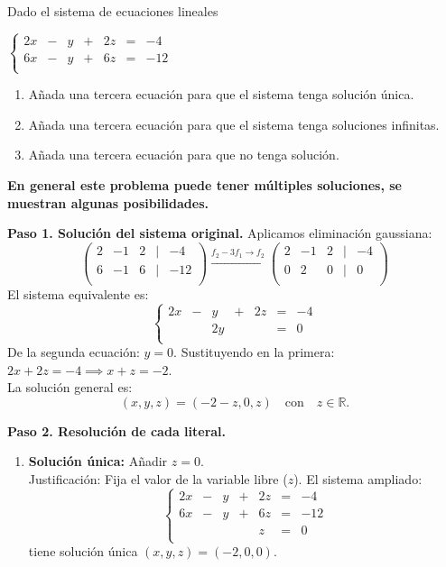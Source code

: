 \begin{prob} 
Dado el sistema de ecuaciones lineales

$\left\lbrace \begin{array}{ccccccc}
2x&-&y&+&2z&=&-4\\
6x&-&y&+&6z&=&-12\\
\end{array} \right. $

\begin{enumerate}[$a)$]
\item Añada una tercera ecuación para que el sistema tenga solución única.
\item Añada una tercera ecuación para que el sistema tenga soluciones infinitas.
\item Añada una tercera ecuación para que no tenga solución.
\end{enumerate}

\begin{myproof} \textbf{En general este problema puede tener múltiples soluciones, se muestran algunas posibilidades.}

\textbf{Paso 1. Solución del sistema original.} Aplicamos eliminación gaussiana:
\[
\begin{pmatrix}
2 & -1 & 2 & | & -4 \\
6 & -1 & 6 & | & -12 \\
\end{pmatrix}
\xrightarrow{f_2 - 3f_1\to f_2}
\begin{pmatrix}
2 & -1 & 2 & | & -4 \\
0 & 2 & 0 & | & 0 \\
\end{pmatrix}
\]
El sistema equivalente es:
\[
\left\lbrace \begin{array}{rcrcrcl}
2x & - & y & + & 2z & = & -4 \\
& & 2y & & & = & 0 \\
\end{array} \right.
\]
De la segunda ecuación: $y = 0$. Sustituyendo en la primera:
$2x + 2z = -4 \implies x + z = -2$.\\
La solución general es:
\[
(x, y, z) = (-2 - z,  0,  z) \quad \text{con} \quad z \in \mathbb{R}.
\]

\textbf{Paso 2. Resolución de cada literal.}
\begin{enumerate}[$a)$]
\item \textbf{Solución única:} Añadir $\boxed{z = 0}$.\\
Justificación: Fija el valor de la variable libre ($z$). El sistema ampliado:
\[
\left\lbrace \begin{array}{rcrcrcl}
2x & - & y & + & 2z & = & -4 \\
6x & - & y & + & 6z & = & -12 \\
& & & & z & = & 0 \\
\end{array} \right.
\]
tiene solución única $(x, y, z) = (-2, 0, 0)$.


\end{enumerate}
\end{myproof}
\end{prob}
